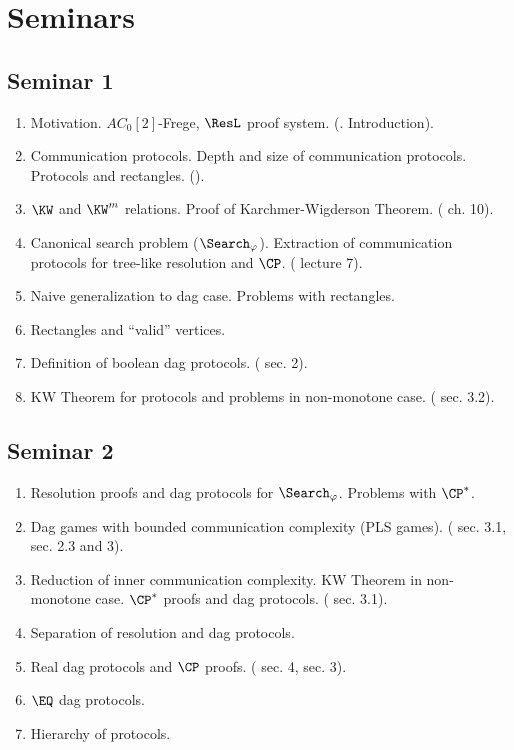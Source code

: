 \section{Seminars}

\subsection{Seminar 1}

\begin{enumerate}
    \item Motivation. $AC_0[2]$-Frege, $\ResL$ proof system. (\cite{Kraj16}. Introduction).
    \item Communication protocols. Depth and size of communication protocols. Protocols and
        rectangles. (\cite{NK97}).
    \item $\KW$ and $\KW^m$ relations. Proof of Karchmer-Wigderson Theorem. (\cite{NK97} ch. 10).
    \item Canonical search problem ($\Search_{\varphi}$). Extraction of communication protocols for
        tree-like resolution and $\CP$. (\cite{PitNote14} lecture 7).
    \item Naive generalization to dag case. Problems with rectangles.
    \item Rectangles and ``valid'' vertices.
    \item Definition of boolean dag protocols. (\cite{Sok17} sec. 2).
    \item KW Theorem for protocols and problems in non-monotone case. (\cite{Sok17} sec. 3.2).
\end{enumerate}


\subsection{Seminar 2}

\begin{enumerate}
    \item Resolution proofs and dag protocols for $\Search_{\varphi}$. Problems with $\CP^*$.
    \item Dag games with bounded communication complexity (PLS games). (\cite{Sok17} sec. 3.1,
        \cite{Razb95} sec. 2.3 and 3).
    \item Reduction of inner communication complexity. KW Theorem in non-monotone case. $\CP^*$ proofs
        and dag protocols. (\cite{Sok17} sec. 3.1).
    \item Separation of resolution and dag protocols.
    \item Real dag protocols and $\CP$ proofs. (\cite{Sok17} sec. 4, \cite{HruPud17} sec. 3).
    \item $\EQ$ dag protocols.
    \item Hierarchy of protocols.
\end{enumerate}


